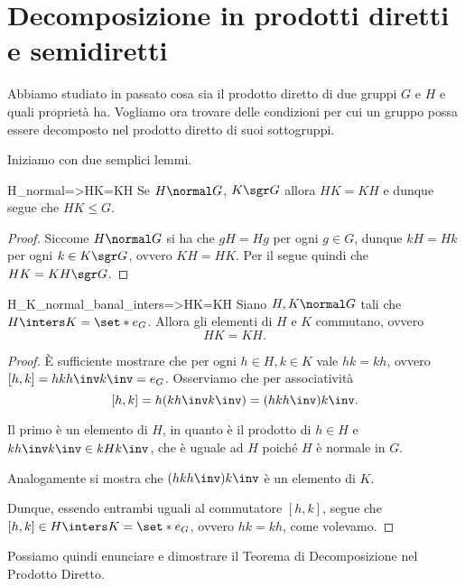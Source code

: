 \section{Decomposizione in prodotti diretti e semidiretti}

Abbiamo studiato in passato cosa sia il prodotto diretto di due gruppi $G$ e $H$ e quali proprietà ha. Vogliamo ora trovare delle condizioni per cui un gruppo possa essere decomposto nel prodotto diretto di suoi sottogruppi.

Iniziamo con due semplici lemmi.

\begin{lemma}
    {}{H_normal=>HK=KH}
    Se $H \normal G$, $K \sgr G$ allora $HK = KH$ e dunque segue che $HK \leq G$.   
\end{lemma}
\begin{proof}
    Siccome $H \normal G$ si ha che $gH = Hg$ per ogni $g \in G$, dunque $kH = Hk$ per ogni $k \in K \sgr G$, ovvero $KH = HK$. Per il  segue quindi che $HK = KH \sgr G$.   
\end{proof}

\begin{lemma}
    {}{H_K_normal_banal_inters=>HK=KH}
    Siano $H, K \normal G$ tali che $H \inters K = \set*{e_G}$. Allora gli elementi di $H$ e $K$ commutano, ovvero \[
        HK = KH.
    \] 
\end{lemma}
\begin{proof}
    È sufficiente mostrare che per ogni $h \in H, k \in K$ vale $hk = kh$, ovvero $[h, k] = hkh\inv k\inv = e_G$. Osserviamo che per associatività \[
        [h, k] = h(kh\inv k\inv) = (hkh\inv) k\inv.
    \] 
    
    Il primo è un elemento di $H$, in quanto è il prodotto di $h \in H$ e $kh\inv k\inv \in kHk\inv$, che è uguale ad $H$ poiché $H$ è normale in $G$.
    
    Analogamente si mostra che $(hkh\inv)k\inv$ è un elemento di $K$.

    Dunque, essendo entrambi uguali al commutatore $[h, k]$, segue che $[h, k] \in H \inters K = \set*{e_G}$, ovvero $hk = kh$, come volevamo.   
\end{proof}

Possiamo quindi enunciare e dimostrare il Teorema di Decomposizione nel Prodotto Diretto.

